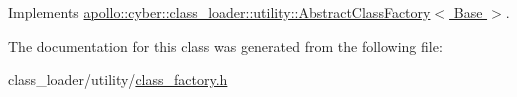 Implements \hyperlink{classapollo_1_1cyber_1_1class__loader_1_1utility_1_1AbstractClassFactory_ae603a03f06c93b5f0475e63a0f2a9402}{apollo\-::cyber\-::class\-\_\-loader\-::utility\-::\-Abstract\-Class\-Factory$<$ Base $>$}.



The documentation for this class was generated from the following file\-:\begin{DoxyCompactItemize}
\item 
class\-\_\-loader/utility/\hyperlink{class__factory_8h}{class\-\_\-factory.\-h}\end{DoxyCompactItemize}
